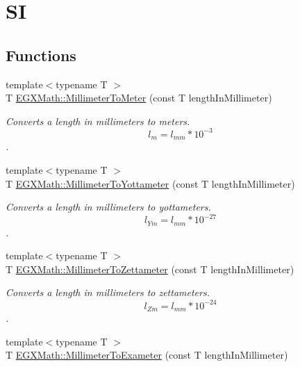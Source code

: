 \hypertarget{group___e_g_x_math-_conversions-_length_conversions-_s_i-_millimeter-_s_i}{}\section{SI}
\label{group___e_g_x_math-_conversions-_length_conversions-_s_i-_millimeter-_s_i}
\subsection*{Functions}
\begin{DoxyCompactItemize}
\item 
{\footnotesize template$<$typename T $>$ }\\T \mbox{\hyperlink{group___e_g_x_math-_conversions-_length_conversions-_s_i-_millimeter-_s_i_ga5bf52177bcfa3cce836b7cec4dcf5fb5}{E\+G\+X\+Math\+::\+Millimeter\+To\+Meter}} (const T length\+In\+Millimeter)
\begin{DoxyCompactList}\small\item\em Converts a length in millimeters to meters. \[ l_{m}=l_{mm} * 10^{-3} \]. \end{DoxyCompactList}\item 
{\footnotesize template$<$typename T $>$ }\\T \mbox{\hyperlink{group___e_g_x_math-_conversions-_length_conversions-_s_i-_millimeter-_s_i_ga0c63bb9317c6f47942e00d23d0bf9762}{E\+G\+X\+Math\+::\+Millimeter\+To\+Yottameter}} (const T length\+In\+Millimeter)
\begin{DoxyCompactList}\small\item\em Converts a length in millimeters to yottameters. \[ l_{Ym}=l_{mm} * 10^{-27} \]. \end{DoxyCompactList}\item 
{\footnotesize template$<$typename T $>$ }\\T \mbox{\hyperlink{group___e_g_x_math-_conversions-_length_conversions-_s_i-_millimeter-_s_i_ga06531acdd75d87de598010df5c9536f5}{E\+G\+X\+Math\+::\+Millimeter\+To\+Zettameter}} (const T length\+In\+Millimeter)
\begin{DoxyCompactList}\small\item\em Converts a length in millimeters to zettameters. \[ l_{Zm}=l_{mm} * 10^{-24} \]. \end{DoxyCompactList}\item 
{\footnotesize template$<$typename T $>$ }\\T \mbox{\hyperlink{group___e_g_x_math-_conversions-_length_conversions-_s_i-_millimeter-_s_i_gaceb47f60171d86e6d552801e9a552530}{E\+G\+X\+Math\+::\+Millimeter\+To\+Exameter}} (const T length\+In\+Millimeter)

\end{DoxyCompactItemize}
